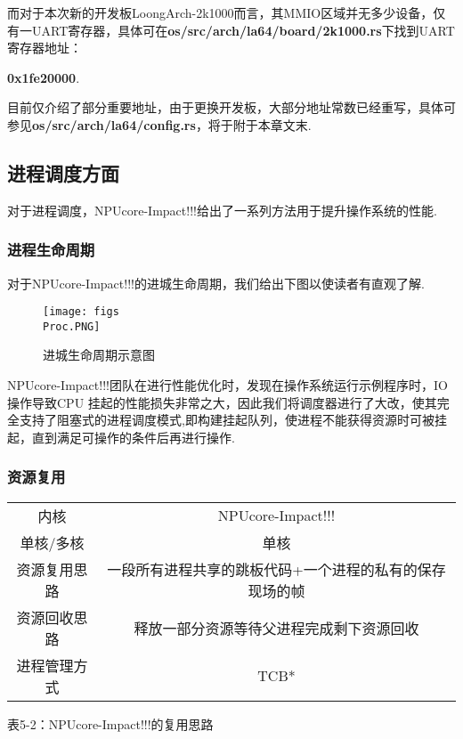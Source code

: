 \documentclass{article}
\begin{document}
而对于本次新的开发板LoongArch-2k1000而言，其MMIO区域并无多少设备，仅有一UART寄存器，具体可在\textbf{os/src/arch/la64/board/2k1000.rs}下找到UART寄存器地址：

\begin{center}
    \textbf{0x1fe20000}.
\end{center}

目前仅介绍了部分重要地址，由于更换开发板，大部分地址常数已经重写，具体可参见\textbf{os/src/arch/la64/config.rs}，将于附于本章文末.

\subsection{进程调度方面}
对于进程调度，NPUcore-Impact!!!给出了一系列方法用于提升操作系统的性能.
\newpage
\subsubsection{进程生命周期}
对于NPUcore-Impact!!!的进城生命周期，我们给出下图以使读者有直观了解.

\begin{figure}[htb]
    \centering
    \texttt{[image: figs\\Proc.PNG]}
    \caption{进城生命周期示意图}
    \label{fig:enter-label}
\end{figure}

NPUcore-Impact!!!团队在进行性能优化时，发现在操作系统运行示例程序时，IO 操作导致CPU 挂起的性能损失非常之大，因此我们将调度器进行了大改，使其完全支持了阻塞式的进程调度模式,即构建挂起队列，使进程不能获得资源时可被挂起，直到满足可操作的条件后再进行操作.

\subsubsection{资源复用}

\begin{center}
\begin{tabular}{|c|c|}
    \hline
    内核 & NPUcore-Impact!!!\\
    单核/多核 & 单核 \\
    \hline
    资源复用思路 & 一段所有进程共享的跳板代码+一个进程的私有的保存现场的帧\\
    资源回收思路 & 释放一部分资源等待父进程完成剩下资源回收\\
    \hline
    进程管理方式 & TCB* \\
    \hline
\end{tabular}
表5-2：NPUcore-Impact!!!的复用思路
\end{center}
\end{document}

